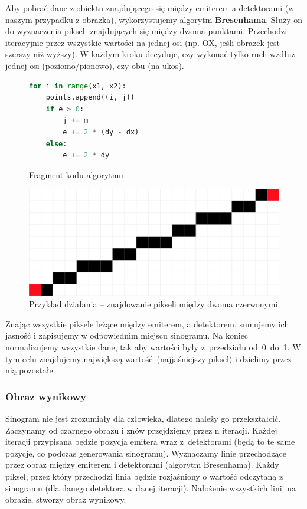 \documentclass[polish,polish,a4paper]{article}
\begin{document}
				Aby pobrać dane z obiektu znajdującego się między emiterem a detektorami (w naszym przypadku z obrazka), wykorzystujemy algorytm \textbf{Bresenhama}. Służy on do wyznaczenia pikseli znajdujących się między dwoma punktami. Przechodzi iteracyjnie przez wszystkie wartości na jednej osi (np. OX, jeśli obrazek jest szerszy niż wyższy). W każdym kroku decyduje, czy wykonać tylko ruch wzdłuż jednej osi (poziomo/pionowo), czy obu (na ukos).
				
				\begin{figure}[!h]
					\centering
					\begin{minipage}{0.4\linewidth}
						\begin{lstlisting}[language=Python, frame=single]
for i in range(x1, x2):
    points.append((i, j))
    if e > 0:
        j += m
        e += 2 * (dy - dx)
    else:
        e += 2 * dy
						\end{lstlisting}
						\caption{Fragment kodu algorytmu}
					\end{minipage}
					\hfill
					\begin{minipage}{0.45\linewidth}
						\includegraphics[width=\textwidth]{img/bresenham.png}
						\caption{Przykład działania -- znajdowanie pikseli między dwoma czerwonymi}
					\end{minipage}
				\end{figure}
				
				Znając wszystkie piksele leżące między emiterem, a detektorem, 
				sumujemy ich jasność i zapisujemy w odpowiednim miejscu sinogramu.
				Na koniec normalizujemy wszystkie dane, tak aby wartości były z~przedziału od~0~do~1. W tym celu znajdujemy największą wartość (najjaśniejszy piksel) i dzielimy przez nią pozostałe.
				
				\subsubsection{Obraz wynikowy}
					Sinogram nie jest zrozumiały dla człowieka, 
					dlatego należy go przekształcić.
					Zaczynamy od czarnego obrazu i znów przejdziemy przez n iteracji.
					Każdej iteracji przypisana będzie pozycja emitera wraz z~detektorami 
					(będą to te same pozycje, co podczas generowania sinogramu).
					Wyznaczamy linie przechodzące przez obraz między emiterem i detektorami (algorytm Bresenhama).
					Każdy piksel, przez który przechodzi linia będzie rozjaśniony o wartość odczytaną z sinogramu 
					(dla danego detektora w danej iteracji). 
					Nałożenie wszystkich linii na obrazie, stworzy obraz wynikowy.
				
\end{document}
